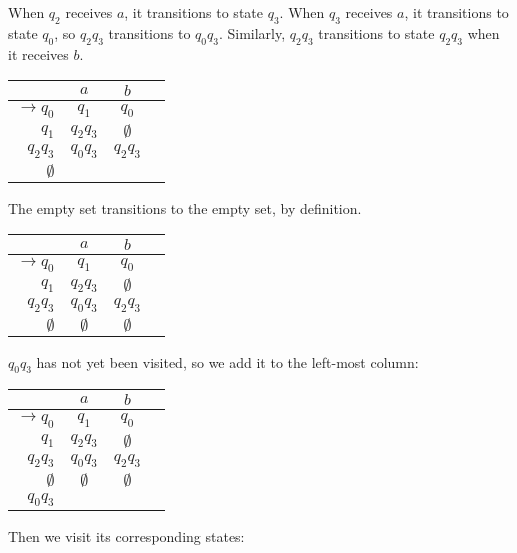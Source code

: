 When \(q_2\) receives \(a\), it transitions to state \(q_3\). When \(q_3\) receives \(a\), it transitions to state \(q_0\), so \(q_2q_3\) transitions to \(q_0q_3\). Similarly, \(q_2q_3\) transitions to state \(q_2q_3\) when it receives \(b\).

\begin{center}\begin{tabular}{r|c c r}
         & \(a\) & \(b\) & \\\bottomrule
    \(\to q_0\) & \(q_1\) & \(q_0\) &  \\
          \(q_1\) & \(q_2q_3\) & \(\emptyset\) & \\
          \(q_2q_3\) & \(q_0q_3\) & \(q_2q_3\) & \\
          \(\emptyset\) & & &
\end{tabular}\end{center}

The empty set transitions to the empty set, by definition. 

\begin{center}\begin{tabular}{r|c c r}
         & \(a\) & \(b\) & \\\bottomrule
    \(\to q_0\) & \(q_1\) & \(q_0\) &  \\
          \(q_1\) & \(q_2q_3\) & \(\emptyset\) & \\
          \(q_2q_3\) & \(q_0q_3\) & \(q_2q_3\) & \\
          \(\emptyset\) & \(\emptyset\) & \(\emptyset\) &
\end{tabular}\end{center}

\(q_0q_3\) has not yet been visited, so we add it to the left-most column:

\begin{center}\begin{tabular}{r|c c r}
         & \(a\) & \(b\) & \\\bottomrule
    \(\to q_0\) & \(q_1\) & \(q_0\) &  \\
          \(q_1\) & \(q_2q_3\) & \(\emptyset\) & \\
          \(q_2q_3\) & \(q_0q_3\) & \(q_2q_3\) & \\
          \(\emptyset\) & \(\emptyset\) & \(\emptyset\) &\\
          \(q_0q_3\) & & & 
\end{tabular}\end{center}

Then we visit its corresponding states:

